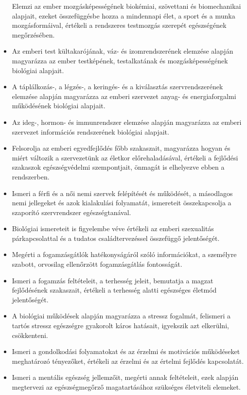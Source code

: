 \begin{itemize}
  Elemzi az ember mozgásképességének biokémiai, szövettani és
  biomechanikai alapjait, ezeket összefüggésbe hozza a mindennapi élet,
  a sport és a munka mozgásformáival, értékeli a rendszeres testmozgás
  szerepét egészségének megőrzésében.
\item
  Az emberi test kültakarójának, váz- és izomrendszerének elemzése
  alapján magyarázza az ember testképének, testalkatának és
  mozgásképességének biológiai alapjait.
\item
  A táplálkozás-, a légzés-, a keringés- és a kiválasztás
  szervrendszerének elemzése alapján magyarázza az emberi szervezet
  anyag- és energiaforgalmi működésének biológiai alapjait.
\item
  Az ideg-, hormon- és immunrendszer elemzése alapján magyarázza az
  emberi szervezet információs rendszerének biológiai alapjait.
\item
  Felsorolja az emberi egyedfejlődés főbb szakaszait, magyarázza hogyan
  és miért változik a szervezetünk az életkor előrehaladásával, értékeli
  a fejlődési szakaszok egészségvédelmi szempontjait, önmagát is
  elhelyezve ebben a rendszerben.
\item
  Ismeri a férfi és a női nemi szervek felépítését és működését, a
  másodlagos nemi jellegeket és azok kialakulási folyamatát, ismereteit
  összekapcsolja a szaporító szervrendszer egészségtanával.
\item
  Biológiai ismereteit is figyelembe véve értékeli az emberi szexualitás
  párkapcsolattal és a tudatos családtervezéssel összefüggő
  jelentőségét.
\item
  Megérti a fogamzásgátlók hatékonyságáról szóló információkat, a
  személyre szabott, orvosilag ellenőrzött fogamzásgátlás fontosságát.
\item
  Ismeri a fogamzás feltételeit, a terhesség jeleit, bemutatja a magzat
  fejlődésének szakaszait, értékeli a terhesség alatti egészséges
  életmód jelentőségét.
\item
  A biológiai működések alapján magyarázza a stressz fogalmát, felismeri
  a tartós stressz egészségre gyakorolt káros hatásait, igyekszik azt
  elkerülni, csökkenteni.
\item
  Ismeri a gondolkodási folyamatokat és az érzelmi és motivációs
  működéseket meghatározó tényezőket, értékeli az érzelmi és az értelmi
  fejlődés kapcsolatát.
\item
  Ismeri a mentális egészség jellemzőit, megérti annak feltételeit, ezek
  alapján megtervezi az egészségmegőrző magatartásához szükséges
  életviteli elemeket.

\end{itemize}

